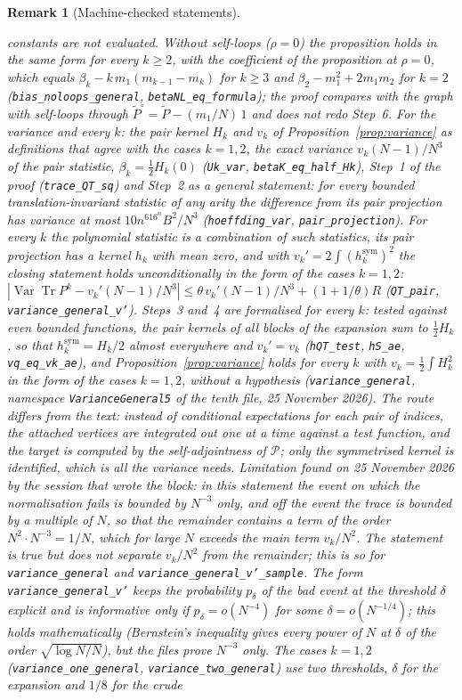 \documentclass[11pt,a4paper]{article}
\theoremstyle{stmt}
\theoremstyle{defn}
\theoremstyle{rmk}
\newtheorem{remark}[theorem]{Remark}
\numberwithin{equation}{section}
\DeclareMathOperator{\Tr}{Tr}
\begin{document}
{\begin{remark}[Machine-checked statements]
\begin{itemize}
constants are not evaluated. Without self-loops ($\rho=0$) the proposition holds in the same form for every $k\ge2$, with the coefficient of the proposition at $\rho=0$, which equals $\beta_k-k\,m_1(m_{k-1}-m_k)$ for $k\ge3$ and $\beta_2-m_1^2+2m_1m_2$ for $k=2$ (\texttt{bias\_noloops\_general}, \texttt{betaNL\_eq\_formula}); the proof compares with the graph with self-loops through $\tilde P^\circ=\tilde P-(m_1/N)\,1$ and does not redo Step~6. For the variance and every $k$: the pair kernel $H_k$ and $v_k$ of Proposition~\ref{prop:variance} as definitions that agree with the cases $k=1,2$, the exact variance $v_k(N-1)/N^3$ of the pair statistic, $\beta_k=\frac12H_k(0)$ (\texttt{Uk\_var}, \texttt{betaK\_eq\_half\_Hk}), Step~1 of the proof (\texttt{trace\_QT\_sq}) and Step~2 as a general statement: for every bounded translation-invariant statistic of any arity the difference from its pair projection has variance at most $10n^616^nB^2/N^3$ (\texttt{hoeffding\_var}, \texttt{pair\_projection}). For every $k$ the polynomial statistic is a combination of such statistics, its pair projection has a kernel $h_k$ with mean zero, and with $v_k'=2\int(h_k^{\mathrm{sym}})^2$ the closing statement holds unconditionally in the form of the cases $k=1,2$: $|\operatorname{Var}\Tr P^k-v_k'(N-1)/N^3|\le\theta\,v_k'(N-1)/N^3+(1+1/\theta)R$ (\texttt{QT\_pair}, \texttt{variance\_general\_v'}). Steps~3 and~4 are formalised for every $k$: tested against even bounded functions, the pair kernels of all blocks of the expansion sum to $\frac12H_k$, so that $h_k^{\mathrm{sym}}=H_k/2$ almost everywhere and $v_k'=v_k$ (\texttt{hQT\_test}, \texttt{hS\_ae}, \texttt{vq\_eq\_vk\_ae}), and Proposition~\ref{prop:variance} holds for every $k$ with $v_k=\frac12\int H_k^2$ in the form of the cases $k=1,2$, without a hypothesis (\texttt{variance\_general}, namespace \texttt{VarianceGeneral5} of the tenth file, 25 November 2026). The route differs from the text: instead of conditional expectations for each pair of indices, the attached vertices are integrated out one at a time against a test function, and the target is computed by the self-adjointness of $\mathcal P$; only the symmetrised kernel is identified, which is all the variance needs. \emph{Limitation found on 25 November 2026 by the session that wrote the block:} in this statement the event on which the normalisation fails is bounded by $N^{-3}$ only, and off the event the trace is bounded by a multiple of $N$, so that the remainder contains a term of the order $N^2\cdot N^{-3}=1/N$, which for large $N$ exceeds the main term $v_k/N^2$. The statement is true but does not separate $v_k/N^2$ from the remainder; this is so for \texttt{variance\_general} and \texttt{variance\_general\_v'\_sample}. The form \texttt{variance\_general\_v'} keeps the probability $p_\delta$ of the bad event at the threshold $\delta$ explicit and is informative only if $p_\delta=o(N^{-4})$ for some $\delta=o(N^{-1/4})$; this holds mathematically (Bernstein's inequality gives every power of $N$ at $\delta$ of the order $\sqrt{\log N/N}$), but the files prove $N^{-3}$ only. The cases $k=1,2$ (\texttt{variance\_one\_general}, \texttt{variance\_two\_general}) use two thresholds, $\delta$ for the expansion and $1/8$ for the crude 
\end{itemize}
\end{remark}}
\end{document}
